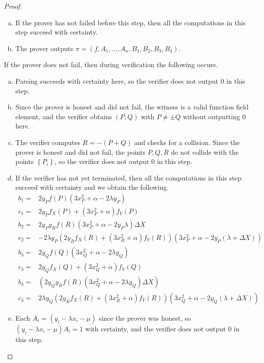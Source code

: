\documentclass[11pt,letterpaper]{article}
\theoremstyle{definition}
\newcommand{\6}{\mathbf}
\newcommand{\7}{\mathcal}
\begin{document}
\begin{proof}
\begin{enumerate}[(a)]
\item If the prover has not failed before this step, then all the computations in this step succeed with certainty.

\item The prover outputs $\pi = (f, A_1, \ldots, A_n, B_1, B_2, B_3, B_4)$.
\end{enumerate}


If the prover does not fail, then during verification the following occurs.
\begin{enumerate}[(a)]
\item Parsing succeeds with certainty here, so the verifier does not output $0$ in this step.
\item Since the prover is honest and did not fail, the witness is a valid function field element, and the verifier obtains $(P, Q)$ with $P \neq \pm Q$ without outputting $0$ here.
\item The verifier computes $R = -(P+Q)$ and checks for a collision. Since the prover is honest and did not fail, the points $P, Q, R$ do not collide with the points $\left\{P_i\right\}$, so the verifier does not output $0$ in this step.

\item If the verifier has not yet terminated, then all the computations in this step succeed with certainty and we obtain the following.
\begin{align}
b_1 =& 2y_Pf(P)(3x_P^2+\alpha-2\lambda y_P) \\
c_1 =& 2y_Pf_X(P) + (3x_P^2+\alpha) f_Y(P)\\
b_2 =& 2y_Py_Rf(R)(3x_P^2+\alpha-2y_P \lambda ) \Delta X\\
c_2 =& - 2\lambda y_P(2y_Rf_X(R) + (3x_R^2+\alpha) f_Y(R))(3x_P^2+\alpha - 2y_P(\lambda + \Delta X))\\
b_3 =& 2y_Qf(Q)(3x_Q^2+\alpha - 2\lambda y_Q)\\
c_3 =& 2y_Qf_X(Q) + (3x_Q^2+\alpha) f_Y(Q) \\
b_4 =& \left(2y_Qy_Rf(R)(3x_Q^2+\alpha  - 2\lambda y_Q) \Delta X\right)\\
c_4 =& 2\lambda y_Q(2y_Rf_X(R) + (3x_R^2+\alpha)f_Y(R))(3x_Q^2+\alpha - 2y_Q(\lambda + \Delta X))
\end{align} 

\item Each $A_i = (y_i - \lambda x_i - \mu)$ since the prover was honest, so $(y_i - \lambda x_i - \mu)A_i = 1$ with certainty, and the verifier does not output $0$ in this step.


\end{enumerate}
\end{proof}
\end{document}
